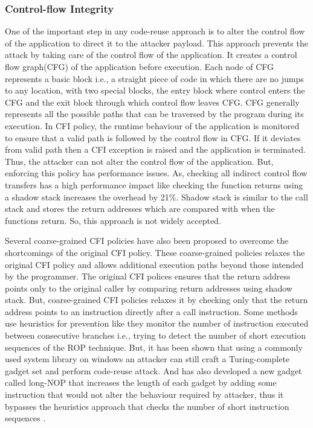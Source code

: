 \documentclass{article}
\begin{document}
\begin{multicols}{2}
	\subsubsection{Control-flow Integrity}
	One of the important step in any code-reuse approach is to alter the control flow of the application to direct it to the attacker payload. This approach prevents the attack by taking care of the control flow of the application. It creates a control flow graph(CFG) of the application before execution. Each node of CFG represents a basic block i.e., a straight piece of code in which there are no jumps to any location, with two special blocks, the entry block where control enters the CFG and the exit block through which control flow leaves CFG. CFG generally represents all the possible paths that can be traversed by the program during its execution. In CFI policy, the runtime behaviour of the application is monitored to ensure that a valid path is followed by the control flow in CFG. If it deviates from valid path then a CFI exception is raised and the application is terminated. Thus, the attacker can not alter the control flow of the application. But, enforcing this policy has performance issues. As, checking all indirect control flow transfers has a high performance impact like checking the function returns using a shadow stack increases the overhead by 21\%. Shadow stack is similar to the call stack and stores the return addresses which are compared with when the functions return. So, this approach is not widely accepted.
	
	Several coarse-grained CFI policies have also been proposed to overcome the shortcomings of the original CFI policy. These coarse-grained policies relaxes the original CFI policy and allows additional execution paths beyond those intended by the programmer. The original CFI polices ensures that the return address points only to the original caller by comparing return addresses using shadow stack. But, coarse-grained CFI policies relaxes it by checking only that the return address points to an instruction directly after a call instruction. Some methods use heuristics for prevention like they monitor the number of instruction executed between consecutive branches i.e., trying to detect the number of short execution sequences of the ROP technique. But, it has been shown that using a commonly used system library on windows an attacker can still craft a Turing-complete gadget set and perform code-reuse attack. And has also developed a new gadget called long-NOP that increases the length of each gadget by adding some instruction that would not alter the behaviour required by attacker, thus it bypasses the heuristics approach that checks the number of short instruction sequences \cite{effcfi}.
	

\end{multicols}
\end{document}
